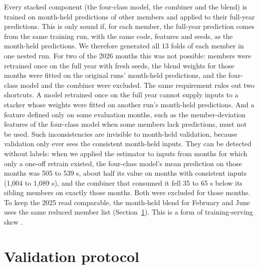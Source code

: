 \documentclass[
  manuscript=article,  %
  layout=preprint,  %
  year=20xx,
  volume=x,
]{extra/joas}
\begin{document}
Every stacked component (the four-class model, the combiner and the blend) is trained on month-held predictions of other members and applied to their full-year predictions. This is only sound if, for each member, the full-year prediction comes from the same training run, with the same code, features and seeds, as the month-held predictions. We therefore generated all 13 folds of each member in one nested run. For two of the 2026 months this was not possible: members were retrained once on the full year with fresh seeds, the blend weights for those months were fitted on the original runs' month-held predictions, and the four-class model and the combiner were excluded. The same requirement rules out two shortcuts. A model retrained once on the full year cannot supply inputs to a stacker whose weights were fitted on another run's month-held predictions. And a feature defined only on some evaluation months, such as the member-deviation features of the four-class model when some members lack predictions, must not be used. Such inconsistencies are invisible to month-held validation, because validation only ever sees the consistent month-held inputs. They can be detected without labels: when we applied the estimator to inputs from months for which only a one-off retrain existed, the four-class model's mean prediction on those months was 505 to 539 s, about half its value on months with consistent inputs (1,004 to 1,089 s), and the combiner that consumed it fell 35 to 65 s below its sibling members on exactly those months. Both were excluded for those months. To keep the 2025 read comparable, the month-held blend for February and June uses the same reduced member list (Section~\ref{sec:validation}). This is a form of training-serving skew \cite{breck2017ml,sculley2015hidden,polyzotis2018data}.


\section{Validation protocol}
\label{sec:validation}
\end{document}
